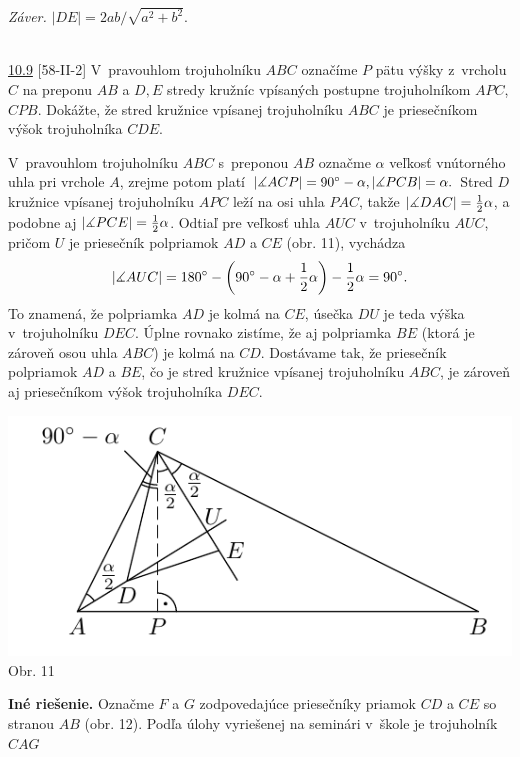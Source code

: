 \textit{Záver.} $|DE| = 2ab/\sqrt{a^2 + b^2}$.\\
\\
\begin{tcolorbox}[breakable,notitle,boxrule=0pt,colback=light-gray,colframe=light-gray]\ul{10.9} [58-II-2]
V~pravouhlom trojuholníku $ABC$ označíme $P$ pätu výšky z~vrcholu $C$ na preponu $AB$ a $D, E$ stredy kružníc vpísaných postupne trojuholníkom $APC$, $CPB$. Dokážte, že stred
kružnice vpísanej trojuholníku $ABC$ je priesečníkom výšok trojuholníka $CDE$.

\end{tcolorbox}

\rieh V~pravouhlom trojuholníku $ABC$ s~preponou $AB$ označme $\alpha$ veľkosť vnútorného uhla pri vrchole $A$, zrejme potom platí $|\measuredangle ACP| = 90^\circ -\alpha, |\measuredangle PCB| = \alpha.$ Stred $D$ kružnice vpísanej trojuholníku $APC$ leží na osi uhla $PAC$, takže $|\measuredangle DAC| = \frac{1}{2}\alpha$, a podobne aj $|\measuredangle PCE| = \frac{1}{2}\alpha$. Odtiaľ pre veľkosť uhla $AUC$ v~trojuholníku $AUC$, pričom $U$ je priesečník polpriamok $AD$ a $CE$ (obr. 11), vychádza
$$|\measuredangle AUC| = 180^\circ -\bigg(90^\circ -\alpha + \frac{1}{2}\alpha\bigg) -\frac{1}{2}\alpha = 90^\circ.$$
To znamená, že polpriamka $AD$ je kolmá na $CE$, úsečka $DU$ je teda výška v~trojuholníku $DEC$. Úplne rovnako zistíme, že aj polpriamka $BE$ (ktorá je zároveň osou uhla $ABC$) je kolmá na $CD$. Dostávame tak, že priesečník polpriamok $AD$ a $BE$, čo je stred kružnice vpísanej trojuholníku $ABC$, je zároveň aj priesečníkom výšok trojuholníka $DEC$.
\begin{center}
\includegraphics{obrazky/58K21}\\

Obr. 11
\end{center}
\textbf{Iné riešenie.} Označme $F$ a $G$ zodpovedajúce priesečníky priamok $CD$ a $CE$ so stranou $AB$ (obr. 12). Podľa úlohy vyriešenej na seminári v~škole je trojuholník $CAG$
